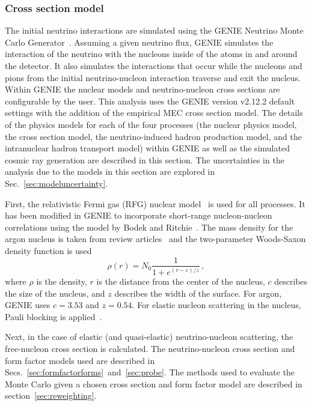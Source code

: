   \subsubsection{Cross section model}\label{sec:geniexsec}
    The initial neutrino interactions are simulated using the GENIE Neutrino
    Monte Carlo Generator~\cite{Andreopoulos:2009rq,Andreopoulos:2015wxa}.
    Assuming a given neutrino flux, GENIE simulates the interaction of the
    neutrino with the nucleons inside of the atoms in and around the detector.
    It also simulates the interactions that occur while the nucleons and pions
    from the initial neutrino-nucleon interaction traverse and exit the
    nucleus. Within GENIE the nuclear models and neutrino-nucleon cross
    sections are configurable by the user. This analysis uses the GENIE version
    v2.12.2 default settings with the addition of the empirical MEC cross
    section model. The details of the physics models for each of the four
    processes (the nuclear physics model, the cross section model, the
    neutrino-induced hadron production model, and the intranuclear hadron
    transport model) within GENIE as well as the simulated cosmic ray
    generation are described in this section. The uncertainties in the analysis
    due to the models in this section are explored in
    Sec.~\ref{sec:modeluncertainty}.

    First, the relativistic Fermi gas (RFG) nuclear model~\cite{RFGmodel} is
    used for all processes. It has been modified in GENIE to incorporate
    short-range nucleon-nucleon correlations using the model by Bodek and
    Ritchie~\cite{BodekrRitchie}. The mass density for the argon nucleus is
    taken from review articles~\cite{nucdensity} and the two-parameter
    Woods-Saxon density function is used~\cite{WoodsSaxon}
    \begin{equation}\label{eq:woodssaxon}
      \rho(r) = N_0\frac{1}{1+e^{(r-c)/z}} \,,
    \end{equation}
    where $\rho$ is the density, $r$ is the distance from the center of the
    nucleus, $c$ describes the size of the nucleus, and $z$ describes the width
    of the surface. For argon, GENIE uses $c=3.53$ and $z=0.54$.  For elastic
    nucleon scattering in the nucleus, Pauli blocking is
    applied~\cite{PauliBlock}.
    
    Next, in the case of elastic (and quasi-elastic) neutrino-nucleon
    scattering, the free-nucleon cross section is calculated. The
    neutrino-nucleon cross section and form factor models used are described in
    Secs.~\ref{sec:formfactorforms}~and~\ref{sec:probe}. The methods used to
    evaluate the Monte Carlo given a chosen cross section and form factor
    model are described in section~\ref{sec:reweighting}.

